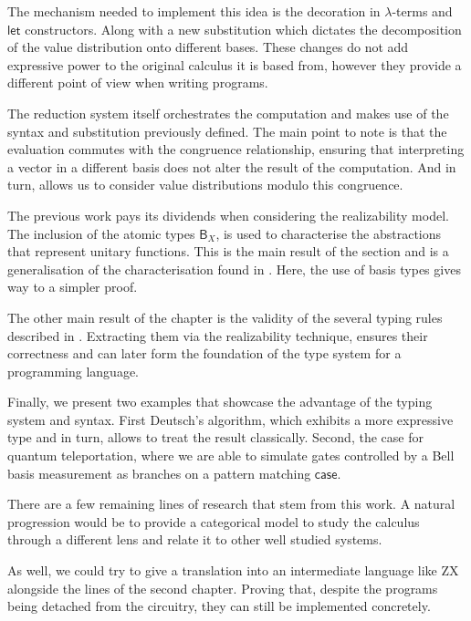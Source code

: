 \documentclass[runningheads,orivec,envcountsame,envcountsect]{llncs}
\newcommand\basis[1]{\ensuremath{\mathsf{B}_{#1}}}
\begin{document}
The mechanism needed to implement this idea is the decoration in $\lambda$-terms and $\mathsf{let}$ constructors. Along with a new substitution which dictates the decomposition of the value distribution onto different bases. These changes do not add expressive power to the original calculus it is based from, however they provide a different point of view when writing programs. 

The reduction system itself orchestrates the computation and makes use of the syntax and substitution previously defined. The main point to note is that the evaluation commutes with the congruence relationship, ensuring that interpreting a vector in a different basis does not alter the result of the computation. And in turn, allows us to consider value distributions modulo this congruence.

The previous work pays its dividends when considering the realizability model. The inclusion of the atomic types $\basis{X}$, is used to characterise the abstractions that represent unitary functions. This is the main result of the section and is a generalisation of the characterisation found in \cite{DiazcaroGuillermoMiquelValironLICS19}. Here, the use of basis types gives way to a simpler proof. 

The other main result of the chapter is the validity of the several typing rules described in . Extracting them via the realizability technique, ensures their correctness and can later form the foundation of the type system for a programming language.

Finally, we present two examples that showcase the advantage of the typing system and syntax. First Deutsch's algorithm, which exhibits a more expressive type and in turn, allows to treat the result classically. Second, the case for quantum teleportation, where we are able to simulate gates controlled by a Bell basis measurement as branches on a pattern matching $\mathsf{case}$. 

There are a few remaining lines of research that stem from this work. A natural progression would be to provide a categorical model to study the calculus through a different lens and relate it to other well studied systems. 

As well, we could try to give a translation into an intermediate language like ZX alongside the lines of the second chapter. Proving that, despite the programs being detached from the circuitry, they can still be  implemented concretely.
\end{document}
